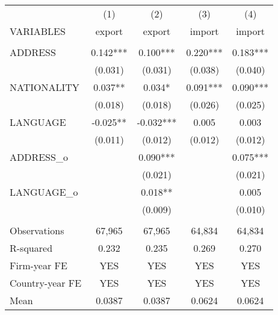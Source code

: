 \begin{tabular}{lcccc} \hline
 & (1) & (2) & (3) & (4) \\
VARIABLES & export & export & import & import \\ \hline
 &  &  &  &  \\
ADDRESS & 0.142*** & 0.100*** & 0.220*** & 0.183*** \\
 & (0.031) & (0.031) & (0.038) & (0.040) \\
NATIONALITY & 0.037** & 0.034* & 0.091*** & 0.090*** \\
 & (0.018) & (0.018) & (0.026) & (0.025) \\
LANGUAGE & -0.025** & -0.032*** & 0.005 & 0.003 \\
 & (0.011) & (0.012) & (0.012) & (0.012) \\
ADDRESS\_o &  & 0.090*** &  & 0.075*** \\
 &  & (0.021) &  & (0.021) \\
LANGUAGE\_o &  & 0.018** &  & 0.005 \\
 &  & (0.009) &  & (0.010) \\
 &  &  &  &  \\
Observations & 67,965 & 67,965 & 64,834 & 64,834 \\
R-squared & 0.232 & 0.235 & 0.269 & 0.270 \\
Firm-year FE & YES & YES & YES & YES \\
Country-year FE & YES & YES & YES & YES \\
 Mean & 0.0387 & 0.0387 & 0.0624 & 0.0624 \\ \hline
\end{tabular}
